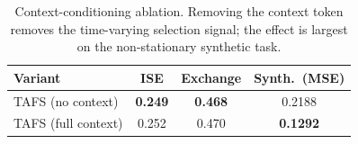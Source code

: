 \begin{table}[t]
\centering
\caption{Context-conditioning ablation. Removing the context token removes the time-varying selection signal; the effect is largest on the non-stationary synthetic task.}
\label{tab:context}
\small
\begin{tabular}{lccc}
\toprule
Variant & ISE & Exchange & Synth.\ (MSE) \\
\midrule
TAFS (no context) & \textbf{0.249} & \textbf{0.468} & 0.2188 \\
TAFS (full context) & 0.252 & 0.470 & \textbf{0.1292} \\
\bottomrule
\end{tabular}
\end{table}
